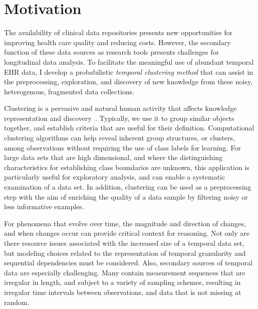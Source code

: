 \section{Motivation}
The availability of clinical data repositories presents new opportunities for improving health care quality and reducing costs.  However, the secondary function of these data sources as research tools presents challenges for longitudinal data analysis.  To facilitate the meaningful use of abundant temporal EHR data, I develop a probabilistic \emph{temporal clustering method} that can assist in the preprocessing, exploration, and discovery of new knowledge from these noisy, heterogenous, fragmented data collections.

Clustering is a pervasive and natural human activity that affects knowledge representation and discovery~\cite{Guyon}.  Typically, we use it to group similar objects together, and establish criteria that are useful for their definition.  Computational clustering algorithms can help reveal inherent group structures, or clusters, among observations without requiring the use of class labels for learning.  For large data sets that are high dimensional, and where the distinguishing characteristics for establishing class boundaries are unknown, this application is particularly useful for exploratory analysis, and can enable a systematic examination of a data set.  In addition, clustering can be used as a preprocessing step with the aim of enriching the quality of a data sample by filtering noisy or less informative examples.

For phenomena that evolve over time, the magnitude and direction of changes, and when changes occur can provide critical context for reasoning.  Not only are there resource issues associated with the increased size of a temporal data set, but modeling choices related to the representation of temporal granularity and sequential dependencies must be considered.  Also, secondary sources of temporal data are especially challenging.  Many contain measurement sequences that are irregular in length, and subject to a variety of sampling schemes, resulting in irregular time intervals between observations, and data that is not missing at random.


